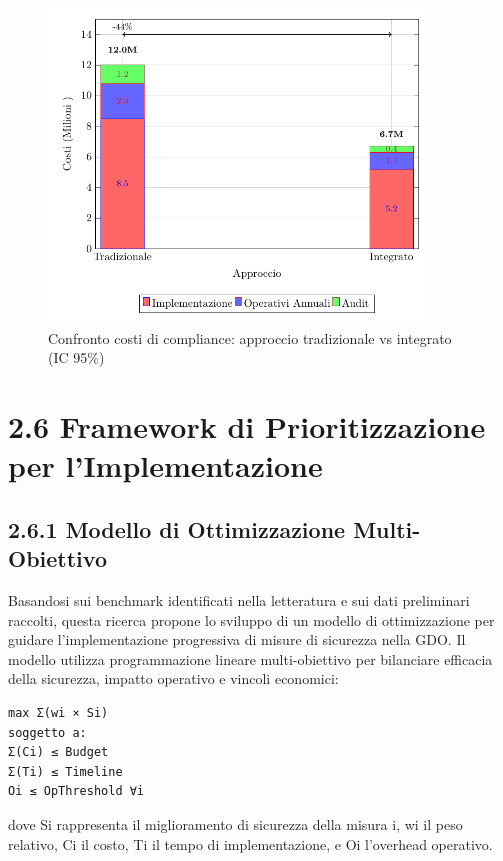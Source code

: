 \documentclass[12pt,a4paper,oneside]{book}
\numberwithin{figure}{chapter} %
\numberwithin{table}{chapter}  %
\begin{document}
\begin{figure}[htbp]
    \centering
    \includegraphics[width=0.9\textwidth]{figura 2-4}
    \caption{Confronto costi di compliance: approccio tradizionale vs integrato (IC 95\%)}
    \label{fig:confronto_costi}
\end{figure}

\section{2.6 Framework di Prioritizzazione per
l'Implementazione}\label{framework-di-prioritizzazione-per-limplementazione}

\subsection{2.6.1 Modello di Ottimizzazione
Multi-Obiettivo}\label{modello-di-ottimizzazione-multi-obiettivo}

Basandosi sui benchmark identificati nella letteratura e sui dati
preliminari raccolti, questa ricerca propone lo sviluppo di un modello
di ottimizzazione per guidare l'implementazione progressiva di misure di
sicurezza nella GDO. Il modello utilizza programmazione lineare
multi-obiettivo per bilanciare efficacia della sicurezza, impatto
operativo e vincoli economici:

\begin{verbatim}
max Σ(wi × Si)
soggetto a:
Σ(Ci) ≤ Budget
Σ(Ti) ≤ Timeline
Oi ≤ OpThreshold ∀i
\end{verbatim}

dove Si rappresenta il miglioramento di sicurezza della misura i, wi il
peso relativo, Ci il costo, Ti il tempo di implementazione, e Oi
l'overhead operativo.
\end{document}
